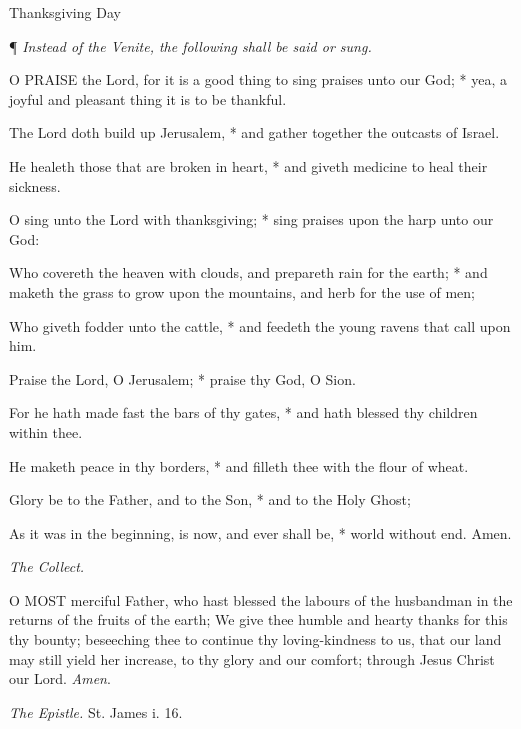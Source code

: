 Thanksgiving Day

¶ \emph{Instead of the Venite, the
following shall be said or sung.}

O PRAISE the Lord, for
it is a good thing to sing praises unto our God; * yea, a joyful and pleasant
thing it is to be thankful.

The Lord doth build up Jerusalem, * and gather together
the outcasts of Israel.

He healeth those that are broken in heart, * and giveth
medicine to heal their sickness.

O sing unto the Lord with thanksgiving; * sing praises
upon the harp unto our God:

Who covereth the heaven with clouds, and prepareth
rain for the earth; * and maketh the grass to grow upon the mountains,
and herb for the use of men;

Who giveth fodder unto the cattle, * and feedeth the
young ravens that call upon him.

Praise the Lord, O Jerusalem; * praise thy God, O Sion.

For he hath made fast the bars of thy gates, * and
hath blessed thy children within thee.

He maketh peace in thy borders, * and filleth thee
with the flour of wheat.

Glory be to the Father, and to the Son, * and to the
Holy Ghost;

As it was in the beginning, is now, and ever shall
be, * world without end. Amen.

\emph{The Collect.}

O MOST merciful Father,
who hast blessed the labours of the husbandman in the returns of the fruits
of the earth; We give thee humble and hearty thanks for this thy bounty;
beseeching thee to continue thy loving-kindness to us, that our land may
still yield her increase, to thy glory and our comfort; through Jesus
Christ our Lord. \emph{Amen}.

\emph{The Epistle.} St. James i. 16.

